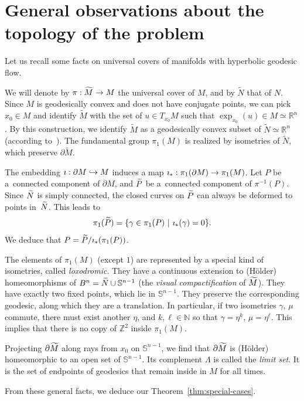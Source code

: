 \documentclass[AHL,Unicode,longabstracts,published]{cedram}
\newcommand{\R}{\mathbb{R}}
\newcommand{\Ss}{\mathbb{S}}
\newcommand{\Z}{\mathbb{Z}}
\newcommand{\N}{\mathbb{N}}
\theoremstyle{plain}
\let\oldtilde\tilde
\renewcommand*{\tilde}[1]{\mathchoice{\widetilde{#1}}{\widetilde{#1}}{\oldtilde{#1}}{\oldtilde{#1}}}
\renewcommand*{\to}{\mathchoice{\longrightarrow}{\rightarrow}{\rightarrow}{\rightarrow}}
\newcommand{\longhookrightarrow}{\lhook\joinrel\longrightarrow}
\newcommand*{\hookto}{\mathchoice{\longhookrightarrow}{\hookrightarrow}{\hookrightarrow}{\hookrightarrow}}
\begin{document}
\section{General observations about the topology of the problem}\label{sec:gen-obs-topo}

Let us recall some facts on universal covers of manifolds with hyperbolic geodesic flow.

We will denote by $\pi:\widetilde{M}\to M$ the universal cover of $M$, and by $\widetilde{N}$ that of $N$. Since $M$ is geodesically convex and does not have conjugate points, we can pick $x_0\in M$ and identify $\widetilde{M}$ with the set of $u\in T_{x_0} M$ such that $\exp_{x_0}(u)\in M\simeq \R^n$. By this construction, we identify $\widetilde{M}$ as a geodesically convex subset of $\widetilde{N}\simeq \R^n$ (according to~\cite{Kobayashi-61}). The fundamental group $\pi_1(M)$ is realized by isometries of $\widetilde{N}$, which preserve $\partial \widetilde{M}$.

The embedding $\imath : \partial M \hookto M$ induces a map $\imath_\ast : \pi_1(\partial M)\to \pi_1(M)$. Let $P$ be a~connected component of $\partial M$, and $\tilde{P}$ be a~connected component of $\pi^{-1}(P)$. Since $\tilde{N}$ is simply connected, the closed curves on $\tilde{P}$ can always be deformed to points in~$\tilde{N}$. This leads to
\[
\pi_1(\tilde{P}) = \{ \gamma \in \pi_1(P)\ |\ \imath_\ast(\gamma) = 0\}.
\]
We deduce that $P = \tilde{P}/\imath_\ast(\pi_1(P))$.

The elements of $\pi_1(M)$ (except $1$) are represented by a special kind of isometries, called \emph{loxodromic}. They have a continuous extension to (H\"older) homeomorphisms of $B^n = \tilde{N}\cup\Ss^{n-1}$ (the \emph{visual compactification} of $\tilde{M}$). They have exactly two fixed points, which lie in $\Ss^{n-1}$. They preserve the corresponding geodesic, along which they are a translation. In particular, if two isometries $\gamma$, $\mu$ commute, there must exist another $\eta$, and $k,\ell\in\N$ so that $\gamma = \eta^k$, $\mu = \eta^\ell$. This implies that there is no copy of $\Z^2$ inside $\pi_1(M)$.

Projecting $\partial \tilde{M}$ along rays from $x_0$ on $\Ss^{n-1}$, we find that $\partial\tilde{M}$ is (H\"older) homeomorphic to an open set of $\Ss^{n-1}$. Its complement $\Lambda$ is called the \emph{limit set}. It is the set of endpoints of geodesics that remain inside in $M$ for all times.

From these general facts, we deduce our Theorem~\ref{thm:special-cases}.
\end{document}
